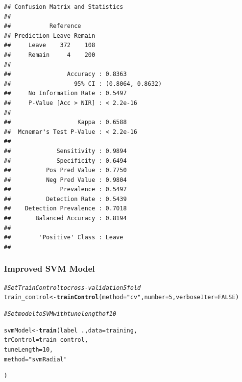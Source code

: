 \documentclass[10pt  ,usenames, dvipsnames]{article}\usepackage[]{graphicx}\usepackage[]{color}
\makeatletter
\newcommand{\hlnum}[1]{\textcolor[rgb]{0.686,0.059,0.569}{#1}}%
\newcommand{\hlstr}[1]{\textcolor[rgb]{0.192,0.494,0.8}{#1}}%
\newcommand{\hlcom}[1]{\textcolor[rgb]{0.678,0.584,0.686}{\textit{#1}}}%
\newcommand{\hlopt}[1]{\textcolor[rgb]{0,0,0}{#1}}%
\newcommand{\hlstd}[1]{\textcolor[rgb]{0.345,0.345,0.345}{#1}}%
\newcommand{\hlkwb}[1]{\textcolor[rgb]{0.69,0.353,0.396}{#1}}%
\newcommand{\hlkwc}[1]{\textcolor[rgb]{0.333,0.667,0.333}{#1}}%
\newcommand{\hlkwd}[1]{\textcolor[rgb]{0.737,0.353,0.396}{\textbf{#1}}}%
\newenvironment{kframe}{%
 \def\at@end@of@kframe{}%
 \ifinner\ifhmode%
  \def\at@end@of@kframe{\end{minipage}}%
  \begin{minipage}{\columnwidth}%
 \fi\fi%
 \def\FrameCommand##1{\hskip\@totalleftmargin \hskip-\fboxsep
 \colorbox{shadecolor}{##1}\hskip-\fboxsep
     \hskip-\linewidth \hskip-\@totalleftmargin \hskip\columnwidth}%
 \MakeFramed {\advance\hsize-\width
   \@totalleftmargin\z@ \linewidth\hsize
   \@setminipage}}%
 {\par\unskip\endMakeFramed%
 \at@end@of@kframe}
\newenvironment{knitrout}{}{} %
\makeatother
\begin{document}
\begin{knitrout}
\color{fgcolor}\begin{kframe}
\begin{verbatim}
## Confusion Matrix and Statistics
## 
##           Reference
## Prediction Leave Remain
##     Leave    372    108
##     Remain     4    200
##                                           
##                Accuracy : 0.8363          
##                  95% CI : (0.8064, 0.8632)
##     No Information Rate : 0.5497          
##     P-Value [Acc > NIR] : < 2.2e-16       
##                                           
##                   Kappa : 0.6588          
##  Mcnemar's Test P-Value : < 2.2e-16       
##                                           
##             Sensitivity : 0.9894          
##             Specificity : 0.6494          
##          Pos Pred Value : 0.7750          
##          Neg Pred Value : 0.9804          
##              Prevalence : 0.5497          
##          Detection Rate : 0.5439          
##    Detection Prevalence : 0.7018          
##       Balanced Accuracy : 0.8194          
##                                           
##        'Positive' Class : Leave           
## 
\end{verbatim}
\end{kframe}
\end{knitrout}


\clearpage

\subsubsection{Improved SVM Model}

\begin{knitrout}
\color{fgcolor}\begin{kframe}
\begin{alltt}
\hlcom{#Set Train Control to cross-validation 5 fold}
\hlstd{train_control}\hlkwb{<-} \hlkwd{trainControl}\hlstd{(}\hlkwc{method}\hlstd{=}\hlstr{"cv"}\hlstd{,} \hlkwc{number}\hlstd{=}\hlnum{5}\hlstd{,}\hlkwc{verboseIter}\hlstd{=}\hlnum{FALSE}\hlstd{)}

\hlcom{#Set model to SVM with tunelength of 10}

\hlstd{svmModel} \hlkwb{<-} \hlkwd{train}\hlstd{(label}\hlopt{~} \hlstd{.,} \hlkwc{data} \hlstd{= training,}
                  \hlkwc{trControl} \hlstd{= train_control,}
                  \hlkwc{tuneLength} \hlstd{=}\hlnum{10}\hlstd{,}
                  \hlkwc{method} \hlstd{=} \hlstr{"svmRadial"}

\hlstd{)}
\end{alltt}
\end{kframe}
\end{knitrout}
\end{document}
